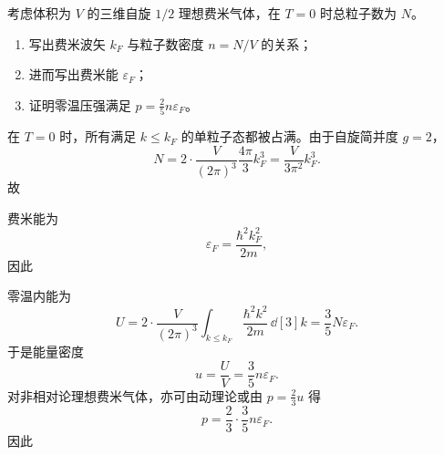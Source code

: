 \begin{question}
考虑体积为 $V$ 的三维自旋 $1/2$ 理想费米气体，在 $T=0$ 时总粒子数为 $N$。

\begin{enumerate}[label=(\arabic*),leftmargin=2.5em]
  \item 写出费米波矢 $k_F$ 与粒子数密度 $n=N/V$ 的关系；
  \item 进而写出费米能 $\varepsilon_F$；
  \item 证明零温压强满足 $p=\frac{2}{5}n\varepsilon_F$。
\end{enumerate}

\begin{solution}
在 $T=0$ 时，所有满足 $k\le k_F$ 的单粒子态都被占满。由于自旋简并度 $g=2$，
\[
N=2\cdot \frac{V}{(2\pi)^3}\frac{4\pi}{3}k_F^3
=\frac{V}{3\pi^2}k_F^3.
\]
故

费米能为
\[
\varepsilon_F=\frac{\hbar^2 k_F^2}{2m},
\]
因此

零温内能为
\[
U=2\cdot \frac{V}{(2\pi)^3}\int_{k\le k_F}\frac{\hbar^2 k^2}{2m}\,\dd[3]{k}
=\frac{3}{5}N\varepsilon_F.
\]
于是能量密度
\[
u=\frac{U}{V}=\frac{3}{5}n\varepsilon_F.
\]
对非相对论理想费米气体，亦可由动理论或由 $p=\frac{2}{3}u$ 得
\[
p=\frac{2}{3}\cdot \frac{3}{5}n\varepsilon_F.
\]
因此
\end{solution}
\end{question}
